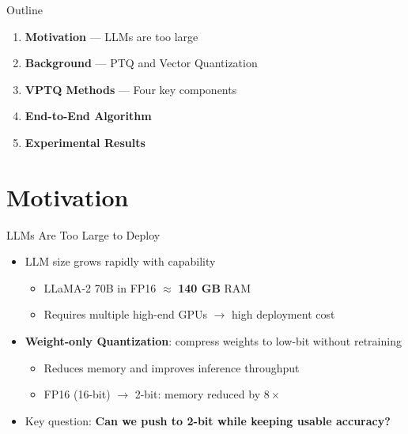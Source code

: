 \begin{frame}{Outline}
  \begin{enumerate}
    \item[\textbf{1.}] \textbf{Motivation} --- LLMs are too large \\[0.6em]
    \item[\textbf{2.}] \textbf{Background} --- PTQ and Vector Quantization \\[0.6em]
    \item[\textbf{3.}] \textbf{VPTQ Methods} --- Four key components \\[0.6em]
    \item[\textbf{4.}] \textbf{End-to-End Algorithm} \\[0.6em]
    \item[\textbf{5.}] \textbf{Experimental Results}
  \end{enumerate}
\end{frame}

\section{Motivation}

\begin{frame}{LLMs Are Too Large to Deploy}
  \begin{itemize}
    \item LLM size grows rapidly with capability
    \begin{itemize}
      \item LLaMA-2 70B in FP16 $\approx$ \textbf{140 GB} RAM
      \item Requires multiple high-end GPUs $\rightarrow$ high deployment cost
    \end{itemize}
    \vspace{0.5em}
    \item \textbf{Weight-only Quantization}: compress weights to low-bit without retraining
    \begin{itemize}
      \item Reduces memory and improves inference throughput
      \item FP16 (16-bit) $\rightarrow$ 2-bit: memory reduced by $8\times$
    \end{itemize}
    \vspace{0.5em}
    \item Key question: \textbf{Can we push to 2-bit while keeping usable accuracy?}
  \end{itemize}
\end{frame}


